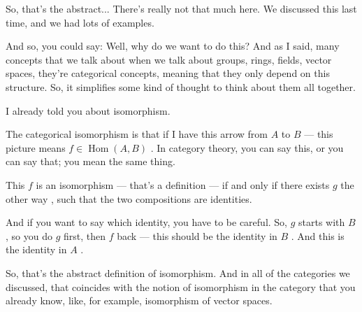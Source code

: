 \begin{speech}[00:03:45 - 00:05:37]
So, that's the abstract... There's really not that much here. We discussed this last time, and we had lots of examples.

And so, you could say: Well, why do we want to do this? And as I said, many concepts that we talk about when we talk about groups, rings, fields, vector spaces, they're categorical concepts, meaning that they only depend on this structure. So, it simplifies some kind of thought to think about them all together.

I already told you about isomorphism. 

The categorical isomorphism is that if I have this arrow from $A$ to $B$  --- this picture means $f \in \operatorname{Hom}(A, B)$ . In category theory, you can say this, or you can say that; you mean the same thing.

This $f$ is an isomorphism  --- that's a definition --- if and only if there exists $g$ the other way , such that  the two compositions are identities.

And if you want to say which identity, you have to be careful. So, $g$ starts with $B$, so you do $g$ first, then $f$ back --- this should be the identity in $B$ . And this is the identity in $A$ .

So, that's the abstract definition of isomorphism. And in all of the categories we discussed, that coincides with the notion of isomorphism in the category that you already know, like, for example, isomorphism of vector spaces.
\end{speech}

\begin{hidden}
\end{hidden}


